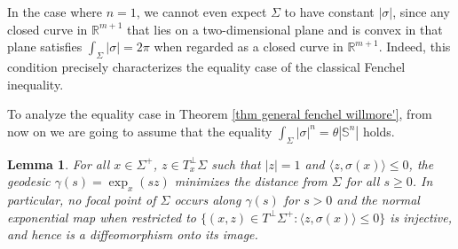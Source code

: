 \documentclass[11pt, reqno]{amsart}
\newtheorem{lemma}[theorem]{Lemma}
\numberwithin{equation}{section}
\begin{document}
In the case where $n = 1$, we cannot even expect $\Sigma$ to have constant $|\sigma|$, since any closed curve in $\mathbb{R}^{m+1}$ that lies on a two-dimensional plane and is convex in that plane satisfies $\int_\Sigma|\sigma|=2\pi$ when regarded as a closed curve in $\mathbb{R}^{m+1}$. Indeed, this condition precisely characterizes the equality case of the classical Fenchel inequality.

To analyze the equality case in Theorem \ref{thm general fenchel willmore'}, from now on we are going to assume that the equality $\int_\Sigma|\sigma|^n =\theta|\mathbb S^n|$ holds.

\begin{lemma}\label{lem no focal}
For all $x \in \Sigma^+$, $z \in {T}_x^{\perp} \Sigma$ such that $|z|=1$ and $\langle z, \sigma(x)\rangle \le 0$,
the geodesic $\gamma(s)=\exp_x\left(sz\right)$ minimizes the distance from $\Sigma$ for all $s \ge0$. In particular, no focal point of $\Sigma$ occurs along $\gamma(s)$ for $s>0$ and the normal exponential map when restricted to $\{(x, z)\in T^\perp \Sigma^+: \langle z, \sigma(x)\rangle \le 0\}$ is injective, and hence is a diffeomorphism onto its image.
\end{lemma}
\end{document}
